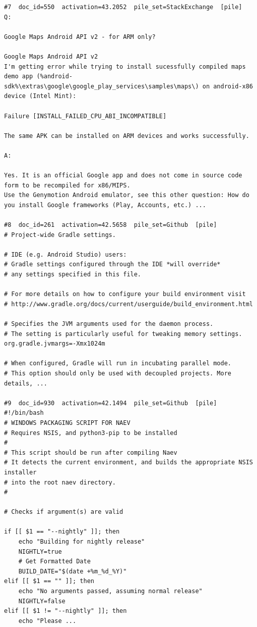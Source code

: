 \begin{verbatim}
#7  doc_id=550  activation=43.2052  pile_set=StackExchange  [pile]
Q:

Google Maps Android API v2 - for ARM only?

Google Maps Android API v2
I'm getting error while trying to install sucessfully compiled maps demo app (%android-sdk%\extras\google\google_play_services\samples\maps\) on android-x86 device (Intel Mint):

Failure [INSTALL_FAILED_CPU_ABI_INCOMPATIBLE]

The same APK can be installed on ARM devices and works successfully.

A:

Yes. It is an official Google app and does not come in source code form to be recompiled for x86/MIPS.
Use the Genymotion Android emulator, see this other question: How do you install Google frameworks (Play, Accounts, etc.) ...

#8  doc_id=261  activation=42.5658  pile_set=Github  [pile]
# Project-wide Gradle settings.

# IDE (e.g. Android Studio) users:
# Gradle settings configured through the IDE *will override*
# any settings specified in this file.

# For more details on how to configure your build environment visit
# http://www.gradle.org/docs/current/userguide/build_environment.html

# Specifies the JVM arguments used for the daemon process.
# The setting is particularly useful for tweaking memory settings.
org.gradle.jvmargs=-Xmx1024m

# When configured, Gradle will run in incubating parallel mode.
# This option should only be used with decoupled projects. More details, ...

#9  doc_id=930  activation=42.1494  pile_set=Github  [pile]
#!/bin/bash
# WINDOWS PACKAGING SCRIPT FOR NAEV
# Requires NSIS, and python3-pip to be installed
#
# This script should be run after compiling Naev
# It detects the current environment, and builds the appropriate NSIS installer
# into the root naev directory.
#

# Checks if argument(s) are valid

if [[ $1 == "--nightly" ]]; then
    echo "Building for nightly release"
    NIGHTLY=true
    # Get Formatted Date
    BUILD_DATE="$(date +%m_%d_%Y)"
elif [[ $1 == "" ]]; then
    echo "No arguments passed, assuming normal release"
    NIGHTLY=false
elif [[ $1 != "--nightly" ]]; then
    echo "Please ...


\end{verbatim}
